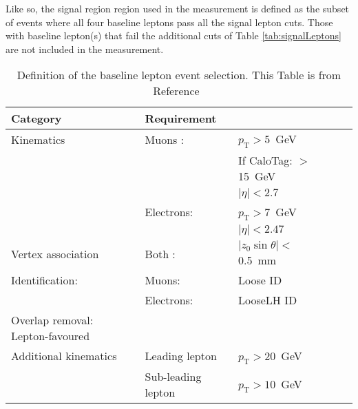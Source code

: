 Like so, the signal region region used in the measurement is defined as the subset of events where all four baseline leptons pass all the signal lepton cuts. Those with baseline lepton(s) that fail the additional cuts of Table \ref{tab:signalLeptons} are not included in the measurement.
 \begin{table}[ht]
    \centering
        \begin{tabular}{lllll}
            Category & Requirement \\
            \hline
            \hline
            Kinematics & Muons : & $p_\text{T} > 5$~GeV{} \\
                       &         &  If CaloTag: $> $15~GeV \\
                       &         &   $|\eta| < 2.7$  \\[0.2cm]
                       & Electrons: & $p_\text{T} > 7$~GeV \\
                       &            & $|\eta| < 2.47$  \\ 
            \hline
            Vertex association 
                       & Both : & $|z_{0} \sin{\theta}| <$0.5~mm \\
            \hline Identification: 
                       & Muons: & Loose ID  \\ 
                       & Electrons: & LooseLH ID  \\
            \hline
            Overlap removal: Lepton-favoured \\ 
            \hline
            Additional kinematics & Leading lepton & $p_\text{T} > 20$~GeV{}\\
                & Sub-leading lepton & $p_\text{T} > 10$~GeV{}\\
        \end{tabular}
    \caption{Definition of the baseline lepton event selection. This Table is from Reference~\cite{m4l_internalnote} \label{tab:baselineLeptons}}
\end{table}  
          
